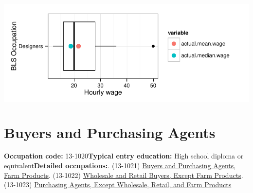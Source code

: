 \documentclass[a4paper,10pt]{article}\usepackage[]{graphicx}\usepackage[]{color}
\makeatletter
\def\maxwidth{ %
  \ifdim\Gin@nat@width>\linewidth
    \linewidth
  \else
    \Gin@nat@width
  \fi
}
\makeatother
\begin{document}
{\centering \includegraphics[width=\maxwidth]{figure/unnamed-chunk-281} 

}


\newpage\section{Buyers and Purchasing Agents}\textbf{Occupation code:} 13-1020\newline\textbf{Typical entry education:} High school diploma or equivalent\newline\textbf{Detailed occupations:}. (13-1021)  \href{http://www.bls.gov/oes/current/oes131021.htm}{Buyers and Purchasing Agents, Farm Products}. (13-1022)  \href{http://www.bls.gov/oes/current/oes131022.htm}{Wholesale and Retail Buyers, Except Farm Products}. (13-1023)  \href{http://www.bls.gov/oes/current/oes131023.htm}{Purchasing Agents, Except Wholesale, Retail, and Farm Products}\newline%
\end{document}
